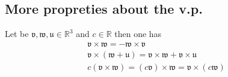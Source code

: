 \documentclass{article}
\begin{document}
        \subsection*{More propreties about the v.p.}
        Let be $\mathfrak{v},\mathfrak{w},\mathfrak{u} \in \mathbb{R}^3$ and $c\in \mathbb{R}$ then one has
        \begin{gather*}
            \mathfrak{v} \times \mathfrak{w} = -\mathfrak{w} \times \mathfrak{v} \\
            \mathfrak{v} \times \left( \mathfrak{w} + \mathfrak{u}\right) = \mathfrak{v} \times \mathfrak{w} + \mathfrak{v} \times \mathfrak{u} \\
            c\left(\mathfrak{v}\times \mathfrak{w}\right) = \left( c\mathfrak{v}\right) \times \mathfrak{w} = \mathfrak{v} \times \left(c\mathfrak{w}\right) \\
        \end{gather*}
\end{document}
